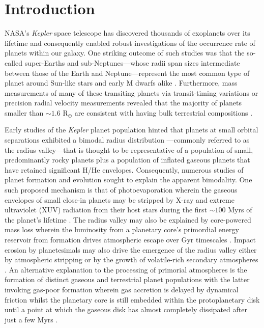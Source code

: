 \documentclass[twocolumn]{emulateapj}
\newcommand{\kepler}[1]{\emph{Kepler}#1}
\begin{document}
\section{Introduction}
NASA's \kepler{} space telescope has discovered thousands of exoplanets over its lifetime and
consequently enabled robust investigations of the occurrence rate of planets within our galaxy.
One striking outcome of such studies was that the so-called super-Earths and sub-Neptunes---whose
radii span sizes intermediate between those of the Earth and Neptune---represent the most common
type of planet around Sun-like stars and early M dwarfs alike
\citep[e.g.][]{youdin11,howard12,dressing13,fressin13,petigura13b,morton14,dressing15a,mulders15,gaidos16,fulton17,hardegree19}.
Furthermore, mass measurements of many of these transiting planets via transit-timing variations
or precision radial velocity measurements revealed that the majority of planets
smaller than $\sim 1.6$ R$_{\oplus}$ are consistent with having bulk terrestrial compositions
\citep[e.g.][]{weiss14,dressing15b,rogers15}.

Early studies of the \kepler{} planet population
hinted that planets at small orbital separations exhibited a
bimodal radius distribution \citep[e.g.][]{owen13}---commonly referred to as the radius valley---that
is thought to be representative of a population of small, predominantly rocky planets plus a population
of inflated gaseous planets that have retained significant H/He envelopes.
Consequently, numerous studies of planet formation and evolution sought to explain the
apparent bimodality. One such proposed mechanism is
that of photoevaporation wherein the gaseous envelopes of small close-in planets may be stripped by
X-ray and extreme ultraviolet (XUV) radiation from their host stars during the first $\sim 100$ Myrs
of the planet's lifetime
\citep{jackson12,owen13,jin14,lopez14,chen16,owen17,jin18,lopez18}.
The radius valley may also be explained by core-powered mass loss wherein the
luminosity from a planetary core's primordial energy reservoir from formation drives atmospheric escape
over Gyr timescales \citep{ginzburg18,gupta19a,gupta19b}.
Impact erosion by planetesimals may also drive the emergence of the radius valley either by atmospheric
stripping or by the growth of volatile-rich secondary atmospheres \citep{shuvalov09,schlichting15,wyatt19}. 
An alternative explanation to the processing of primorial atmospheres is the formation of distinct gaseous and
terrestrial planet populations with the latter invoking gas-poor formation wherein gas accretion is delayed
by dynamical friction whilst the
planetary core is still embedded within the protoplanetary disk until a point at which the gaseous disk
has almost completely dissipated after just a few Myrs \citep{lee14,lee16,lopez18}.
\end{document}
